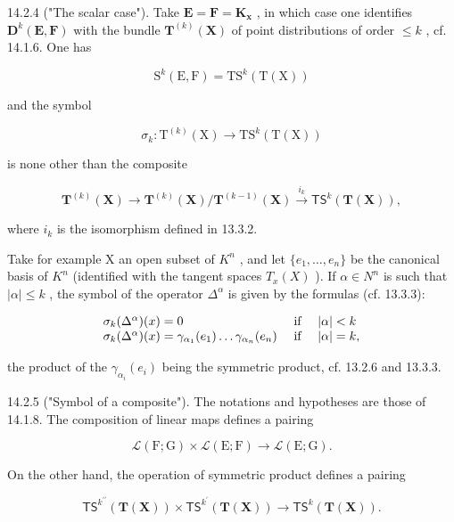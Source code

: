 14.2.4 ("The scalar case"). Take \(\mathbf{E} = \mathbf{F} = \mathbf{K}_{\mathbf{x}}\) , in which case one identifies \(\mathbf{D}^k(\mathbf{E}, \mathbf{F})\) with the bundle \(\mathbf{T}^{(k)}(\mathbf{X})\) of point distributions of order \(\leqslant k\) , cf. 14.1.6. One has

\[
\mathrm{S} ^ {k} (\mathrm{E}, \mathrm{F}) = \mathrm{TS} ^ {k} (\mathrm{T} (\mathrm{X}))
\]

and the symbol

\[
\sigma_ {k} \colon \mathrm{T} ^ {(k)} (\mathrm{X}) \rightarrow \mathrm{TS} ^ {k} (\mathrm{T} (\mathrm{X}))
\]

is none other than the composite

\[
\mathbf {T} ^ {(k)} (\mathbf {X}) \rightarrow \mathbf {T} ^ {(k)} (\mathbf {X}) / \mathbf {T} ^ {(k - 1)} (\mathbf {X}) \xrightarrow {i _ {k}} \mathsf {T S} ^ {k} (\mathbf {T} (\mathbf {X})),
\]

where \(i_{k}\) is the isomorphism defined in 13.3.2.

Take for example X an open subset of \(K^{n}\) , and let \(\{e_{1},\ldots,e_{n}\}\) be the canonical basis of \(K^{n}\) (identified with the tangent spaces \(T_{x}(X)\) ). If \(\alpha\in N^{n}\) is such that \(|\alpha|\leqslant k\) , the symbol of the operator \(\Delta^{\alpha}\) is given by the formulas (cf. 13.3.3):

\[
\begin{array}{l l} \sigma_ {k} (\Delta^ {\alpha}) (x) = 0 & \text { if } \quad | \alpha | <   k \\ \sigma_ {k} (\Delta^ {\alpha}) (x) = \gamma_ {\alpha_ {1}} (e _ {1}) \ldots \gamma_ {\alpha_ {n}} (e _ {n}) & \text { if } \quad | \alpha | = k, \end{array}
\]

the product of the \(\gamma_{\alpha_i}(e_i)\) being the symmetric product, cf. 13.2.6 and 13.3.3.

14.2.5 ("Symbol of a composite"). The notations and hypotheses are those of 14.1.8. The composition of linear maps defines a pairing

\[
\mathcal {L} (\mathrm{F}; \mathrm{G}) \times \mathcal {L} (\mathrm{E}; \mathrm{F}) \rightarrow \mathcal {L} (\mathrm{E}; \mathrm{G}).
\]

On the other hand, the operation of symmetric product defines a pairing

\[
\mathsf {T S} ^ {k ^ {\prime \prime}} (\mathbf {T} (\mathbf {X})) \times \mathsf {T S} ^ {k ^ {\prime}} (\mathbf {T} (\mathbf {X})) \rightarrow \mathsf {T S} ^ {k} (\mathbf {T} (\mathbf {X})).
\]

